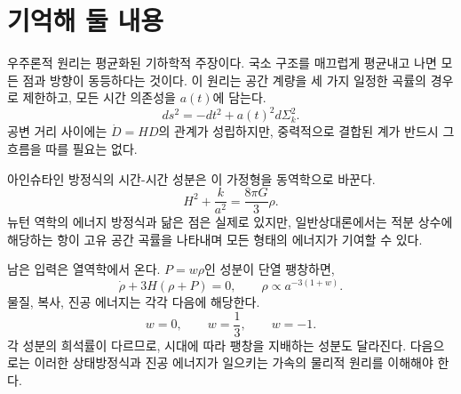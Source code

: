 \begin{classroomqa}\end{classroomqa}

\section{기억해 둘 내용}

우주론적 원리는 평균화된 기하학적 주장이다. 국소 구조를 매끄럽게 평균내고 나면 모든 점과 방향이 동등하다는 것이다. 이 원리는 공간 계량을 세 가지 일정한 곡률의 경우로 제한하고, 모든 시간 의존성을 \(a(t)\)에 담는다.
\begin{equation}
ds^2=-dt^2+a(t)^2d\Sigma_k^2.
\end{equation}
공변 거리 사이에는 \(\dot D=HD\)의 관계가 성립하지만, 중력적으로 결합된 계가 반드시 그 흐름을 따를 필요는 없다.

아인슈타인 방정식의 시간-시간 성분은 이 가정형을 동역학으로 바꾼다.
\begin{equation}
H^2+\frac{k}{a^2}=\frac{8\pi G}{3}\rho.
\end{equation}
뉴턴 역학의 에너지 방정식과 닮은 점은 실제로 있지만, 일반상대론에서는 적분 상수에 해당하는 항이 고유 공간 곡률을 나타내며 모든 형태의 에너지가 기여할 수 있다.

남은 입력은 열역학에서 온다. \(P=w\rho\)인 성분이 단열 팽창하면,
\begin{equation}
\dot\rho+3H(\rho+P)=0,
\qquad
\rho\propto a^{-3(1+w)}.
\end{equation}
물질, 복사, 진공 에너지는 각각 다음에 해당한다.
\begin{equation}
w=0,\qquad w=\frac13,\qquad w=-1.
\end{equation}
각 성분의 희석률이 다르므로, 시대에 따라 팽창을 지배하는 성분도 달라진다. 다음으로는 이러한 상태방정식과 진공 에너지가 일으키는 가속의 물리적 원리를 이해해야 한다.
